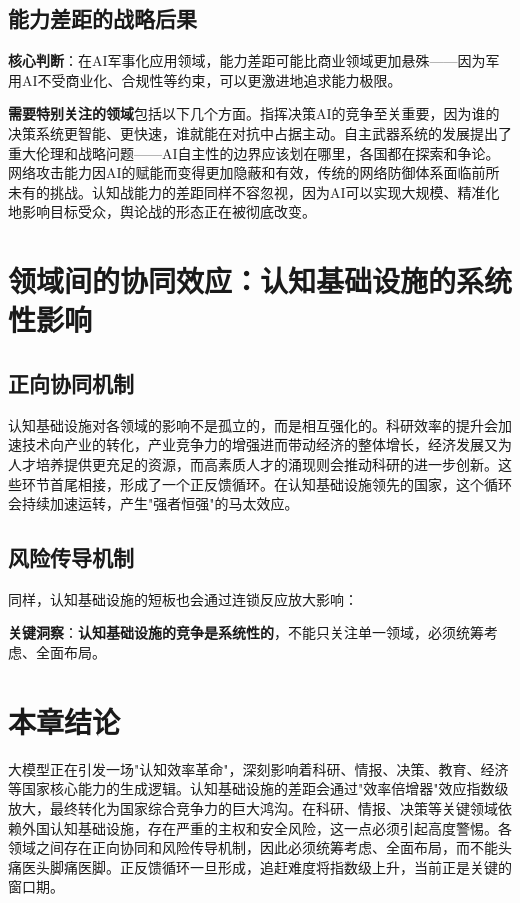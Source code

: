 \subsection{能力差距的战略后果}

\textbf{核心判断}：在AI军事化应用领域，能力差距可能比商业领域更加悬殊——因为军用AI不受商业化、合规性等约束，可以更激进地追求能力极限。

\textbf{需要特别关注的领域}包括以下几个方面。指挥决策AI的竞争至关重要，因为谁的决策系统更智能、更快速，谁就能在对抗中占据主动。自主武器系统的发展提出了重大伦理和战略问题——AI自主性的边界应该划在哪里，各国都在探索和争论。网络攻击能力因AI的赋能而变得更加隐蔽和有效，传统的网络防御体系面临前所未有的挑战。认知战能力的差距同样不容忽视，因为AI可以实现大规模、精准化地影响目标受众，舆论战的形态正在被彻底改变。

\section{领域间的协同效应：认知基础设施的系统性影响}

\subsection{正向协同机制}

认知基础设施对各领域的影响不是孤立的，而是相互强化的。科研效率的提升会加速技术向产业的转化，产业竞争力的增强进而带动经济的整体增长，经济发展又为人才培养提供更充足的资源，而高素质人才的涌现则会推动科研的进一步创新。这些环节首尾相接，形成了一个正反馈循环。在认知基础设施领先的国家，这个循环会持续加速运转，产生"强者恒强"的马太效应。

\subsection{风险传导机制}

同样，认知基础设施的短板也会通过连锁反应放大影响：

\textbf{关键洞察}：\textbf{认知基础设施的竞争是系统性的}，不能只关注单一领域，必须统筹考虑、全面布局。

\section{本章结论}

大模型正在引发一场"认知效率革命"，深刻影响着科研、情报、决策、教育、经济等国家核心能力的生成逻辑。认知基础设施的差距会通过"效率倍增器"效应指数级放大，最终转化为国家综合竞争力的巨大鸿沟。在科研、情报、决策等关键领域依赖外国认知基础设施，存在严重的主权和安全风险，这一点必须引起高度警惕。各领域之间存在正向协同和风险传导机制，因此必须统筹考虑、全面布局，而不能头痛医头脚痛医脚。正反馈循环一旦形成，追赶难度将指数级上升，当前正是关键的窗口期。

